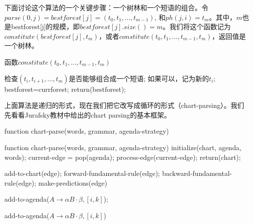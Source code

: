 \documentclass{article}
\begin{document}
\begin{CJK}{UTF8}{gbsn}
下面讨论这个算法的一个关键步骤：一个树林和一个短语的组合。令$parse(0,j)=bestforest[j]=(t_0,t_1,\ldots,t_{m-1})$, 和$ph(j,i)=t_m$。其中，$m$也是bestforest[j]的规模，即$bestforest[j].size()=m$。我们将这个函数记为$constitute(bestforest[j],t_m)$，或者$constitute(t_0,t_1,\ldots,t_{m-1},t_m)$，返回值是一个树林。

\begin{algorithm}
\caption{函数$constitute(t_0,t_1,\ldots,t_{m-1},t_m)$}
\begin{algorithmic}
\STATE  检查$(t_i,t_{i+1},\ldots, t_m)$是否能够组合成一个短语;
\STATE  如果可以，记为新的$t_i$;
\STATE bestforest=currforest;
\ENDIF
\ENDFOR
\STATE return(bestforest);
\end{algorithmic}
\label{alg:recurparse}
\end{algorithm}

上面算法是递归的形式，现在我们把它改写成循环的形式（chart-parsing）。我们先看看Jurafsky教材中给出的chart parsing的基本框架。

\begin{algorithm}
\caption{function chart-parse(words, grammar, agenda-strategy)}
\begin{algorithmic}
\STATE function chart-parse(words, grammar, agenda-strategy)
\STATE initialize(chart, agenda, words);
\STATE current-edge = pop(agenda);
\STATE process-edge(current-edge);
\ENDWHILE
\STATE return(chart);
\end{algorithmic}

\vspace{1pc}
\begin{algorithmic}
\STATE add-to-chart(edge);
\STATE forward-fundamental-rule(edge);
\ELSE
\STATE backward-fundamental-rule(edge);
\ENDIF
\STATE make-predictions(edge)
\end{algorithmic}

\vspace{1pc}
\begin{algorithmic}
\STATE add-to-agenda($A\to \alpha B \cdot \beta,[i,k]$);
\ENDFOR
\end{algorithmic}

\vspace{1pc}
\begin{algorithmic}
\STATE add-to-agenda($A\to \alpha B \cdot \beta,[i,k]$)
\ENDFOR
\end{algorithmic}


\end{algorithm}
\end{CJK}
\end{document}
